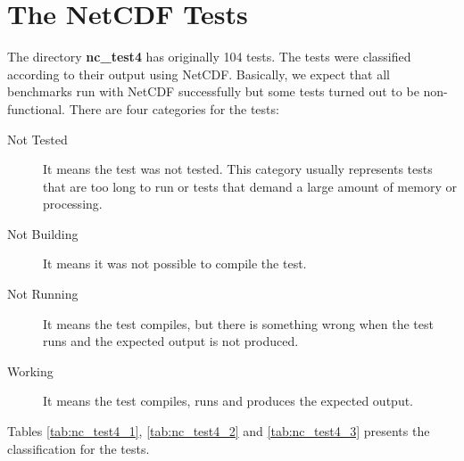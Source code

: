 \chapter{The NetCDF Tests}
\label{ch:nctests}


The directory \textbf{nc\_test4} has originally 104 tests. The tests were classified according to their output using NetCDF. Basically, we expect that all benchmarks run with NetCDF successfully but some tests turned out to be non-functional.
There are four categories for the tests:

\begin{description}

\item[Not Tested] It means the test was not tested. This category usually represents tests that are too long to run or tests that demand a large amount of memory or processing.

\item[Not Building] It means it was not possible to compile the test.

\item[Not Running] It means the test compiles, but there is something wrong when the test runs and the expected output is not produced.

\item[Working] It means the test compiles, runs and produces the expected output.

\end{description}

Tables \ref{tab:nc_test4_1}, \ref{tab:nc_test4_2} and \ref{tab:nc_test4_3} presents the classification for the tests.
